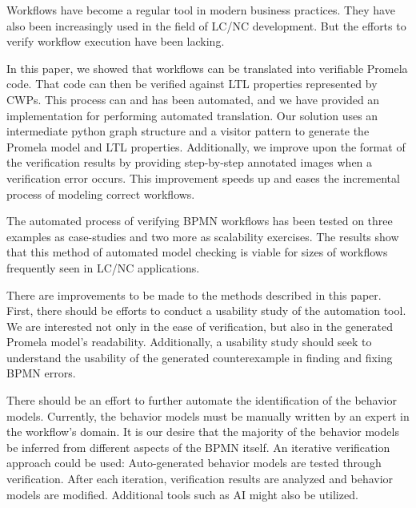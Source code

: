 \begin{comment}
Other research under consideration could explore reuse of verified designs in watcher systems that monitor their deployed implementations. CWP models could also be used to derive efficiency measures, e.g., reducing the amount of activity that does not advance the CWP states could be a new approach to efficiency.  

The focus of conventional design methods is on software, which leaves important aspects of system success largely to chance. 
This paper's novel contribution is verifiable integration of human-computer teaming on cognitive tasks. 
The need is industry-wide. 
Expected benefits of verifiable integration include greater safety and reliability of systems for many other critical domains. 

\end{comment}

Workflows have become a regular tool in modern business practices. They have also been increasingly used in the field of LC/NC development. But the efforts to verify workflow execution have been lacking. 

In this paper, we showed that workflows can be translated into verifiable Promela code. That code can then be verified against LTL properties represented by CWPs. This process can and has been automated, and we have provided an implementation for performing automated translation. Our solution uses an intermediate python graph structure and a visitor pattern to generate the Promela model and LTL properties. Additionally, we improve upon the format of the verification results by providing step-by-step annotated images when a verification error occurs. This improvement speeds up and eases the incremental process of modeling correct workflows.

The automated process of verifying BPMN workflows has been tested on three examples as case-studies and two more as scalability exercises. The results show that this method of automated model checking is viable for sizes of workflows frequently seen in LC/NC applications.

There are improvements to be made to the methods described in this paper. First, there should be efforts to conduct a usability study of the automation tool. We are interested not only in the ease of verification, but also in the generated Promela model's readability. Additionally, a usability study should seek to understand the usability of the generated counterexample in finding and fixing BPMN errors.

There should be an effort to further automate the identification of the behavior models. Currently, the behavior models must be manually written by an expert in the workflow's domain. It is our desire that the majority of the behavior models be inferred from different aspects of the BPMN itself. An iterative verification approach could be used: Auto-generated behavior models are tested through verification. After each iteration, verification results are analyzed and behavior models are modified. Additional tools such as AI might also be utilized.

